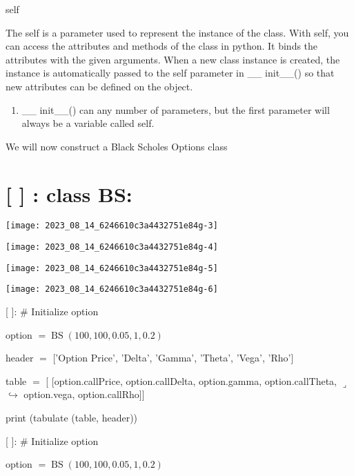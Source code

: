 \documentclass[10pt]{article}
\begin{document}
self

The self is a parameter used to represent the instance of the class. With self, you can access the attributes and methods of the class in python. It binds the attributes with the given arguments. When a new class instance is created, the instance is automatically passed to the self parameter in \_\_ init\_\_() so that new attributes can be defined on the object.

\begin{enumerate}
  \item \_\_ init\_\_() can any number of parameters, but the first parameter will always be a variable called self.
\end{enumerate}

We will now construct a Black Scholes Options class

\section*{[ ] : class BS:}
\begin{center}
\texttt{[image: 2023\_08\_14\_6246610c3a4432751e84g-3]}
\end{center}

\begin{center}
\texttt{[image: 2023\_08\_14\_6246610c3a4432751e84g-4]}
\end{center}

\begin{center}
\texttt{[image: 2023\_08\_14\_6246610c3a4432751e84g-5]}
\end{center}

\begin{center}
\texttt{[image: 2023\_08\_14\_6246610c3a4432751e84g-6]}
\end{center}

[ ]: \# Initialize option

option $=\operatorname{BS}(100,100,0.05,1,0.2)$

header $=$ ['Option Price', 'Delta', 'Gamma', 'Theta', 'Vega', 'Rho']

table $=$ [ [option.callPrice, option.callDelta, option.gamma, option.callTheta, $\lrcorner$ $\hookrightarrow$ option.vega, option.callRho]]

print (tabulate (table, header))

[ ]: \# Initialize option

option $=\operatorname{BS}(100,100,0.05,1,0.2)$
\end{document}
